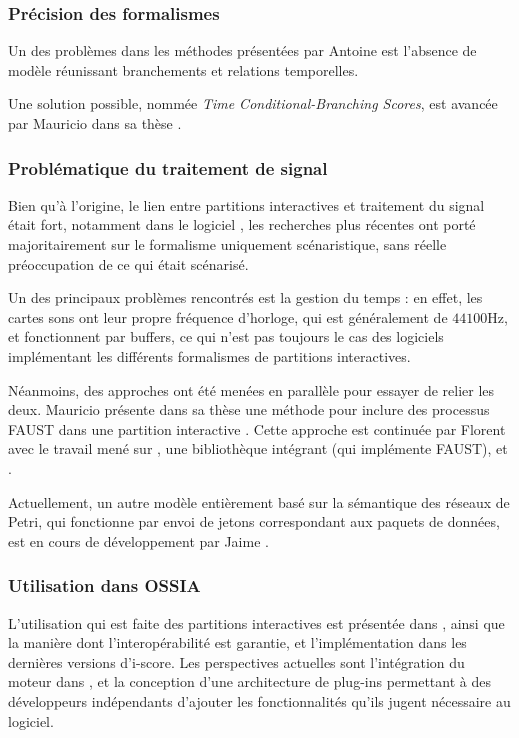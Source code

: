 \subsubsection{Précision des formalismes}
Un des problèmes dans les méthodes présentées par Antoine  est l'absence de modèle réunissant branchements et relations temporelles.

Une solution possible, nommée \textit{Time Conditional-Branching Scores}, est avancée par Mauricio  dans sa thèse \cite{mauricio2012structured}.

\subsubsection{Problématique du traitement de signal}
Bien qu'à l'origine, le lien entre partitions interactives et traitement du signal était fort, notamment dans le logiciel , les recherches plus récentes ont porté majoritairement sur le formalisme uniquement scénaristique, sans réelle préoccupation de ce qui était scénarisé.

Un des principaux problèmes rencontrés est la gestion du temps : en effet, les cartes sons ont leur propre fréquence d'horloge, qui est généralement de $\num{44100}\si{\hertz}$, et fonctionnent par buffers, ce qui n'est pas toujours le cas des logiciels implémentant les différents formalismes de partitions interactives.

Néanmoins, des approches ont été menées en parallèle pour essayer de relier les deux. Mauricio  présente dans sa thèse une méthode pour inclure des processus \ac{FAUST} dans une partition interactive \cite[chapitre 8]{mauricio2012structured}.
Cette approche est continuée par Florent  avec le travail mené sur , une bibliothèque intégrant  (qui implémente \ac{FAUST}), et  \cite{desaintecatherine2014interactive}.

Actuellement, un autre modèle entièrement basé sur la sémantique des réseaux de Petri, qui fonctionne par envoi de jetons correspondant aux paquets de données, est en cours de développement par Jaime  \cite{arias2014modelling}.

\subsubsection{Utilisation dans OSSIA}
L'utilisation qui est faite des partitions interactives est présentée dans \cite{hogue2014ossia}, ainsi que la manière dont l'interopérabilité est garantie, et l'implémentation dans les dernières versions d'i-score.
Les perspectives actuelles sont l'intégration du moteur  dans , et la conception d'une architecture de plug-ins permettant à des développeurs indépendants d'ajouter les fonctionnalités qu'ils jugent nécessaire au logiciel.
